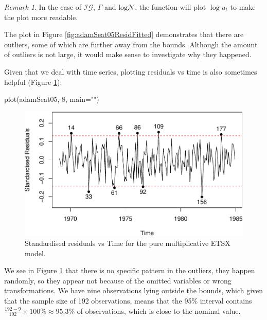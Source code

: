 \documentclass[
]{book}
\newenvironment{Shaded}{\begin{snugshade}}{\end{snugshade}}
\newcommand{\AttributeTok}[1]{\textcolor[rgb]{0.77,0.63,0.00}{#1}}
\newcommand{\DecValTok}[1]{\textcolor[rgb]{0.00,0.00,0.81}{#1}}
\newcommand{\FunctionTok}[1]{\textcolor[rgb]{0.00,0.00,0.00}{#1}}
\newcommand{\NormalTok}[1]{#1}
\newcommand{\StringTok}[1]{\textcolor[rgb]{0.31,0.60,0.02}{#1}}
\theoremstyle{definition}
\theoremstyle{definition}
\theoremstyle{definition}
\theoremstyle{definition}
\theoremstyle{remark}
\newtheorem*{remark}{Remark}
\begin{document}
\begin{remark}
In the case of \(\mathcal{IG}\), \(\Gamma\) and \(\mathrm{log}\mathcal{N}\), the function will plot \(\log u_t\) to make the plot more readable.
\end{remark}

The plot in Figure \ref{fig:adamSeat05ResidFitted} demonstrates that there are outliers, some of which are further away from the bounds. Although the amount of outliers is not large, it would make sense to investigate why they happened.

Given that we deal with time series, plotting residuals vs time is also sometimes helpful (Figure \ref{fig:adamSeat05ResidTime}):

\begin{Shaded}
\begin{Highlighting}[]
\FunctionTok{plot}\NormalTok{(adamSeat05, }\DecValTok{8}\NormalTok{, }\AttributeTok{main=}\StringTok{""}\NormalTok{)}
\end{Highlighting}
\end{Shaded}

\begin{figure}
\centering
\includegraphics{Svetunkov--2022----ADAM_files/figure-latex/adamSeat05ResidTime-1.pdf}
\caption{\label{fig:adamSeat05ResidTime}Standardised residuals vs Time for the pure multiplicative ETSX model.}
\end{figure}

We see in Figure \ref{fig:adamSeat05ResidTime} that there is no specific pattern in the outliers, they happen randomly, so they appear not because of the omitted variables or wrong transformations. We have nine observations lying outside the bounds, which given that the sample size of 192 observations, means that the 95\% interval contains \(\frac{192-9}{192} \times 100 \% \approx 95.3 \%\) of observations, which is close to the nominal value.
\end{document}
